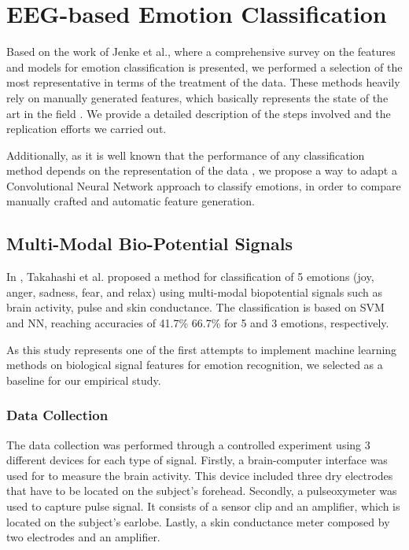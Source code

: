 \documentclass{sig-alternate}
\begin{document}
\section{EEG-based Emotion Classification }
\label{methods}
	
Based on the work of Jenke et al.\cite{jenke2014feature}, where a 
comprehensive survey on  the features and models for emotion 
classification is presented, we performed a selection of the most 
representative in terms of the treatment of the data. These methods 
heavily rely on manually generated features, which basically represents 
the state of the art in the field \cite{}. We provide a detailed description 
of the steps involved and the replication efforts we carried out. 

Additionally, as it is well known that the performance of any 
classification method depends on the representation of the data 
\cite{bengio2013representation}, 
we propose a way to adapt a Convolutional Neural 
Network approach to classify emotions, in order to compare  
manually crafted and automatic feature generation. 

\subsection{ Multi-Modal Bio-Potential Signals}	

In \cite{takahashi2004}, Takahashi et al. proposed a  method for 
 classification of 5 emotions (joy, anger, sadness, fear, and relax)
using multi-modal biopotential signals such as brain activity, pulse and
 skin conductance. The classification is based on SVM and NN, reaching 
 accuracies of  41.7\%  66.7\% for 5 and 3 emotions, respectively. 
 
As this  study represents one of the first attempts to implement 
machine learning methods on biological signal features for emotion
 recognition, we selected as a baseline for our empirical study. 
 
\subsubsection{Data Collection}

The data collection was performed through a controlled 
experiment using 3 different devices for each type of signal. 
Firstly,  a  brain-computer interface was used for to measure 
the brain activity. This device included 
three dry electrodes that have to be located on the subject's 
forehead. Secondly, a pulseoxymeter was used to capture 
pulse signal. It consists of a sensor clip and an amplifier, which 
is located  on the  subject's earlobe. Lastly, a skin 
conductance meter composed by two electrodes and an amplifier. 
\end{document}
